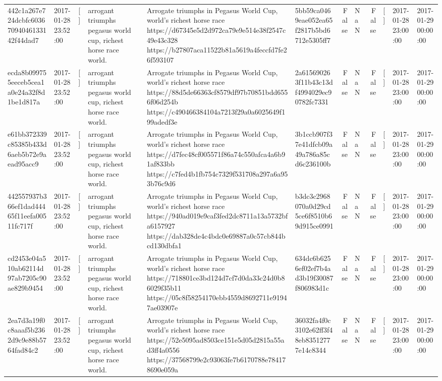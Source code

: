 \begin{tabular}{llllllrlrlll}
442c1a267e724dcbfc60367094046133142f44dad7 & 2017-01-28 23:52:00 & [] & arrogant triumphs pegasus world cup, richest horse race world. & Arrogate triumphs in Pegasus World Cup, world's richest horse race https://d67345e5d2d972ca79e9e514e38f2547c49e43c328 https://b27807aca11522b81a5619a4feccfd7fe26f593107 & 5bb59ca0469eae052ea65f2817b5bd6712e5305ff7 & False & NaN & False & [] & 2017-01-28 23:00:00 & 2017-01-29 00:00:00 \\
ecda8b099755eeceb5cea1a0e24a32f8d1be1d817a & 2017-01-28 23:52:00 & [] & arrogant triumphs pegasus world cup, richest horse race world. & Arrogate triumphs in Pegasus World Cup, world's richest horse race https://88d5de66363cf8579df97b70851bdd6556f06d254b https://c490466384104a7213f29a0a6025649f199adedf3e & 2a615690263f11b43c13df4994029ec90782fc7331 & False & NaN & False & [] & 2017-01-28 23:00:00 & 2017-01-29 00:00:00 \\
e61bb372339c85385b433d6aeb5b72e9aead95acc9 & 2017-01-28 23:52:00 & [] & arrogant triumphs pegasus world cup, richest horse race world. & Arrogate triumphs in Pegasus World Cup, world's richest horse race https://d7fec48cf005571f86a74c550afca4a6b91af833bb https://c7fed4b1fb754c7329f531708a297a6a953b76c9d6 & 3b1ccb907f37e41dfcb09a49a786a85cd6c236100b & False & NaN & False & [] & 2017-01-28 23:00:00 & 2017-01-29 00:00:00 \\
442557937b366ef1dad44465f11eefa00511fc717f & 2017-01-28 23:52:00 & [] & arrogant triumphs pegasus world cup, richest horse race world. & Arrogate triumphs in Pegasus World Cup, world's richest horse race https://940ad019e9caf3fed2dc8711a13a5732bfa6157927 https://dab328de4c4bdc0e69887a0c57cb844bcd130dbfa1 & b3dc3c2968070a0d29cd5ce6f8510b69d915ce0991 & False & NaN & False & [] & 2017-01-28 23:00:00 & 2017-01-29 00:00:00 \\
cd2453e04a510ab62114d97ab7205c90ae829b9454 & 2017-01-28 23:52:00 & [] & arrogant triumphs pegasus world cup, richest horse race world. & Arrogate triumphs in Pegasus World Cup, world's richest horse race https://718801ce3bd124d7cf7d0da33c24d0b86029f35b11 https://05c8f58254170ebb4559d8692711e91947ae03907e & 634dc6b6256ef02ef7b4ad3b19f30087f806983d1c & False & NaN & False & [] & 2017-01-28 23:00:00 & 2017-01-29 00:00:00 \\
2ea7d3a19f0c8aaaf5b2362d9c9e88b5764fad84c2 & 2017-01-28 23:52:00 & [] & arrogant triumphs pegasus world cup, richest horse race world. & Arrogate triumphs in Pegasus World Cup, world's richest horse race https://52e5095ad8503ce151e5d05d2815a55ad3ff4a0556 https://37568799e2c93063fe7b6170788e784178690e059a & 36032fa4f0c3102e62ff3f48eb83512777e14c8344 & False & NaN & False & [] & 2017-01-28 23:00:00 & 2017-01-29 00:00:00 \\

\end{tabular}
